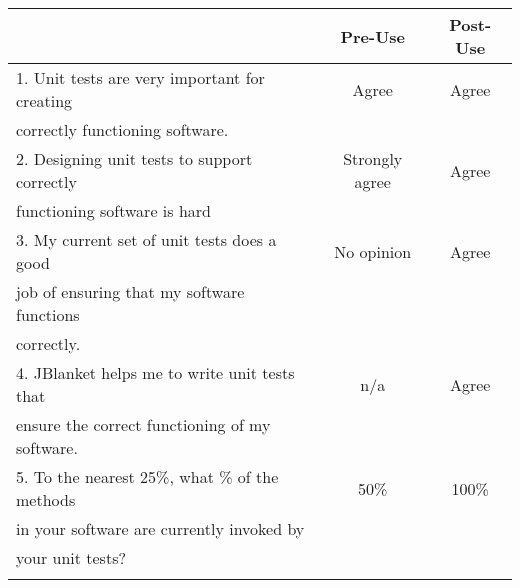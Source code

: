 \begin{tabular}{lcc} \\
 & {\bf Pre-Use} & {\bf Post-Use} \\ \hline
1. Unit tests are very important for creating & Agree & Agree \\
   correctly functioning software. \\ \hline

2. Designing unit tests to support correctly & Strongly agree & Agree \\
   functioning software is hard\\ \hline

3. My current set of unit tests does a good & No opinion & Agree \\
   job of ensuring that my software functions \\
   correctly.\\ \hline

4. JBlanket helps me to write unit tests that & n/a & Agree \\
   ensure the correct functioning of my software.\\ \hline

5. To the nearest 25\%, what \% of the methods & 50\% & 100\% \\
   in your software are currently invoked by \\
   your unit tests?\\ \hline
\\
\end{tabular}

